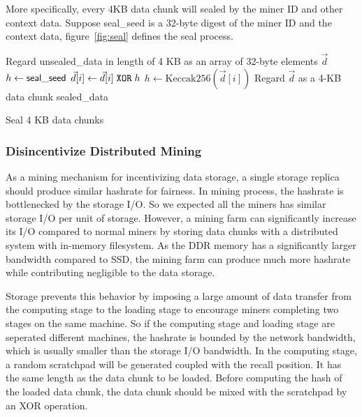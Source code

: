More specifically, every 4KB data chunk will sealed by the miner ID and other context data. 
%
Suppose {\sf seal\_seed} is a 32-byte digest of the miner ID and the context data, figure~\ref{fig:seal} defines the seal process.
%

\begin{algorithm}
	\small
	\SetNlSty{}{}{}
	\DontPrintSemicolon
	Regard {\sf unsealed\_data} in length of 4 KB as an array of 32-byte elements $\vec{d}$\;
	$h\leftarrow {\sf seal\_seed}$\;
	 {
		$\vec{d}[i]\leftarrow \vec{d}[i]{\;\tt XOR\;} h$\;
		$h\leftarrow \textrm{Keccak256}(\vec{d}[i])$\;
	}
	Regard $\vec{d}$ as a 4-KB data chunk {\sf sealed\_data}\;
	\caption{Seal 4 KB data chunks}
	\label{fig:seal}
	\vspace{-4mm}
\end{algorithm}

\subsubsection{Disincentivize Distributed Mining}

As a mining mechanism for incentivizing data storage, a single storage replica should produce similar hashrate for fairness.
%
In {\sproof} mining process, the hashrate is bottlenecked by the storage I/O. 
%
So we expected all the miners has similar storage I/O per unit of storage. 
%
However, a mining farm can significantly increase its I/O compared to normal miners by storing data chunks with a distributed system with in-memory filesystem.
%
As the DDR memory has a significantly larger bandwidth compared to SSD, the mining farm can produce much more hashrate while contributing negligible to the data storage. 

\projabbrev Storage prevents this behavior by imposing a large amount of data transfer from the computing stage to the loading stage to encourage miners completing two stages on the same machine. 
%
So if the computing stage and loading stage are seperated different machines, the hashrate is bounded by the network bandwidth, which is usually smaller than the storage I/O bandwidth.
%
In the computing stage, a random scratchpad will be generated coupled with the recall position. 
%
It has the same length as the data chunk to be loaded. 
%
Before computing the hash of the loaded data chunk, the data chunk should be mixed with the scratchpad by an XOR operation.


